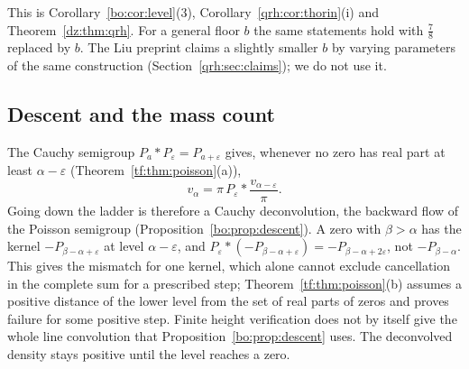 This is Corollary~\ref{bo:cor:level}(3), Corollary~\ref{qrh:cor:thorin}(i) and Theorem~\ref{dz:thm:qrh}. For a general floor $b$ the same statements hold with $\frac78$ replaced by $b$. The Liu preprint \cite{Liu26a} claims a slightly smaller $b$ by varying parameters of the same construction (Section~\ref{qrh:sec:claims}); we do not use it.

\subsection{Descent and the mass count}\label{qt:sec:descent}

The Cauchy semigroup $P_a*P_\varepsilon=P_{a+\varepsilon}$ gives, whenever no zero has real part at least $\alpha-\varepsilon$ (Theorem~\ref{tf:thm:poisson}(a)),
\[
v_\alpha=\pi\,P_\varepsilon*\frac{v_{\alpha-\varepsilon}}\pi .
\]
Going down the ladder is therefore a Cauchy deconvolution, the backward flow of the Poisson semigroup (Proposition~\ref{bo:prop:descent}). A zero with $\beta>\alpha$ has the kernel $-P_{\beta-\alpha+\varepsilon}$ at level $\alpha-\varepsilon$, and $P_\varepsilon*(-P_{\beta-\alpha+\varepsilon})=-P_{\beta-\alpha+2\varepsilon}$, not $-P_{\beta-\alpha}$. This gives the mismatch for one kernel, which alone cannot exclude cancellation in the complete sum for a prescribed step; Theorem~\ref{tf:thm:poisson}(b) assumes a positive distance of the lower level from the set of real parts of zeros and proves failure for some positive step. Finite height verification does not by itself give the whole line convolution that Proposition~\ref{bo:prop:descent} uses. The deconvolved density stays positive until the level reaches a zero.

